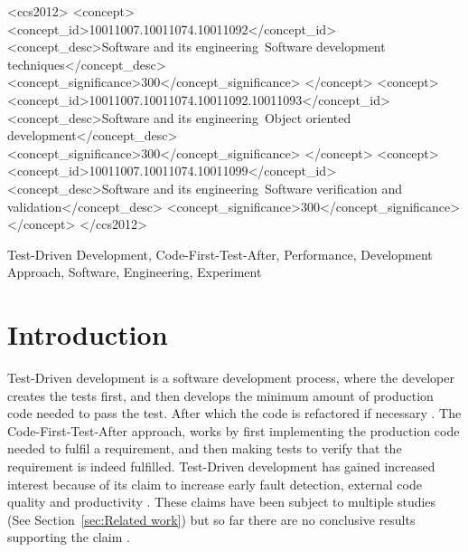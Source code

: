 \documentclass{sig-alternate-05-2015}
\begin{document}
%
%
\begin{CCSXML}
<ccs2012>
<concept>
<concept_id>10011007.10011074.10011092</concept_id>
<concept_desc>Software and its engineering~Software development techniques</concept_desc>
<concept_significance>300</concept_significance>
</concept>
<concept>
<concept_id>10011007.10011074.10011092.10011093</concept_id>
<concept_desc>Software and its engineering~Object oriented development</concept_desc>
<concept_significance>300</concept_significance>
</concept>
<concept>
<concept_id>10011007.10011074.10011099</concept_id>
<concept_desc>Software and its engineering~Software verification and validation</concept_desc>
<concept_significance>300</concept_significance>
</concept>
</ccs2012>
\end{CCSXML}



%
%

%
%
\printccsdesc

\begin{keywords}
Test-Driven Development, Code-First-Test-After, Performance, Development Approach, Software, Engineering, \newline Experiment
\end{keywords}

\section{Introduction}
Test-Driven development is a software development process, where the developer creates the tests first, and then develops the minimum amount of production code needed to pass the test. After which the code is refactored if necessary \cite{beck1}. The Code-First-Test-After approach, works by first implementing the production code needed to fulfil a requirement, and then making tests to verify that the requirement is indeed fulfilled. Test-Driven development has gained increased interest because of its claim to increase early fault detection, external code quality and productivity \cite{astels1}. These claims have been subject to multiple studies (See Section~\ref{sec:Related work}) but so far there are no conclusive results supporting the claim \cite{shull1}.
\end{document}
